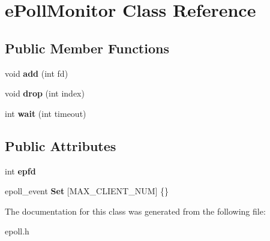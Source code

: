 \hypertarget{classePollMonitor}{}\section{e\+Poll\+Monitor Class Reference}
\label{classePollMonitor}
\subsection*{Public Member Functions}
\begin{DoxyCompactItemize}
\item 
\mbox{\label{classePollMonitor_aebeaa590ed90cbec989b191f71065416}} 
void {\bfseries add} (int fd)
\item 
\mbox{\label{classePollMonitor_a284229cc3cdf2990f9dc254dd290f1ff}} 
void {\bfseries drop} (int index)
\item 
\mbox{\label{classePollMonitor_ad9ed7d467f348301e2deed4da9f31e7e}} 
int {\bfseries wait} (int timeout)
\end{DoxyCompactItemize}
\subsection*{Public Attributes}
\begin{DoxyCompactItemize}
\item 
\mbox{\label{classePollMonitor_aa119e786a1e3bbe7a5f9072a66697bc1}} 
int {\bfseries epfd}
\item 
\mbox{\label{classePollMonitor_abc3257cf7ac7a8296497ee7dcf2d11fe}} 
epoll\+\_\+event {\bfseries Set} \mbox{[}M\+A\+X\+\_\+\+C\+L\+I\+E\+N\+T\+\_\+\+N\+UM\mbox{]} \{\}
\end{DoxyCompactItemize}


The documentation for this class was generated from the following file\+:\begin{DoxyCompactItemize}
\item 
epoll.\+h\end{DoxyCompactItemize}

